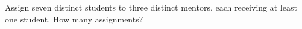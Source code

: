 Assign seven distinct students to three distinct mentors, each receiving at least one student. How many assignments?
